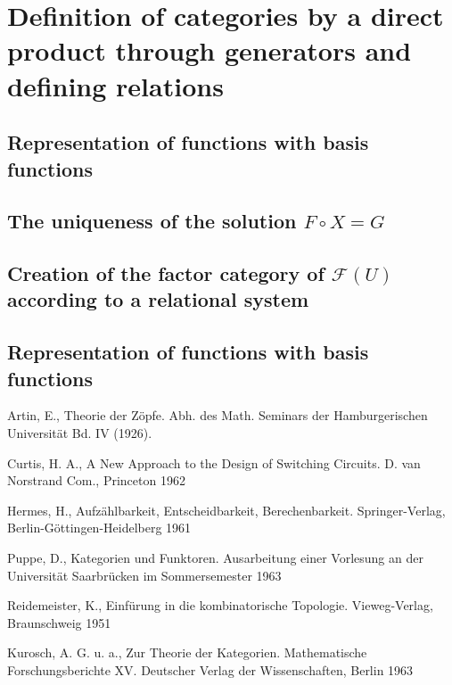 \documentclass{article}
\begin{document}
\section{Definition of categories by a direct product through generators and defining relations}
\subsection{Representation of functions with basis functions}
\label{basis-function-representation}
\subsection{The uniqueness of the solution $F \circ X = G$}
\subsection{Creation of the factor category of $\mathcal{F}(U)$ according to a relational system}
\subsection{Representation of functions with basis functions}

\begin{thebibliography}{9}
Artin, E., Theorie der Zöpfe. Abh. des Math. Seminars der Hamburgerischen Universit\"{a}t Bd. IV (1926).

Curtis, H. A., A New Approach to the Design of Switching Circuits. D. van Norstrand Com., Princeton 1962

Hermes, H., Aufz\"{a}hlbarkeit, Entscheidbarkeit, Berechenbarkeit. Springer-Verlag, Berlin-G\"{o}ttingen-Heidelberg 1961

Puppe, D., Kategorien und Funktoren. Ausarbeitung einer Vorlesung an der Universit\"{a}t Saarbr\"{u}cken im Sommersemester 1963

Reidemeister, K., Einf\"{u}rung in die kombinatorische Topologie. Vieweg-Verlag, Braunschweig 1951

Kurosch, A. G. u. a., Zur Theorie der Kategorien. Mathematische Forschungsberichte XV. Deutscher Verlag der Wissenschaften, Berlin 1963
\end{thebibliography}
\end{document}
